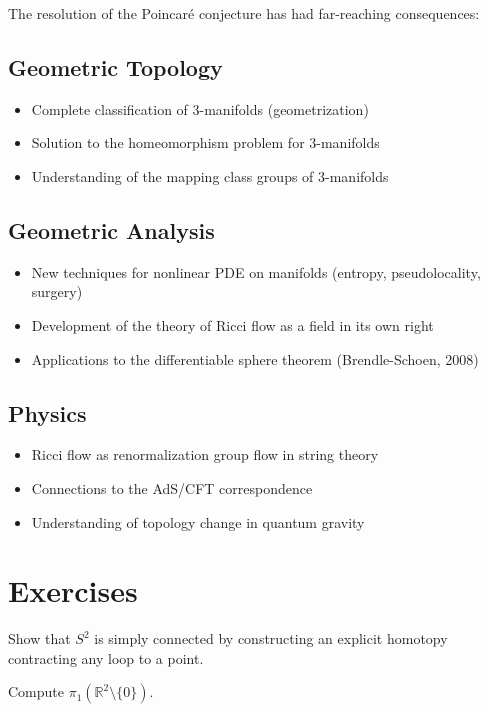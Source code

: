 The resolution of the Poincar\'{e} conjecture has had far-reaching consequences:

\subsection{Geometric Topology}
\begin{itemize}
  \item Complete classification of 3-manifolds (geometrization)
  \item Solution to the homeomorphism problem for 3-manifolds
  \item Understanding of the mapping class groups of 3-manifolds
\end{itemize}

\subsection{Geometric Analysis}
\begin{itemize}
  \item New techniques for nonlinear PDE on manifolds (entropy, pseudolocality, surgery)
  \item Development of the theory of Ricci flow as a field in its own right
  \item Applications to the differentiable sphere theorem (Brendle-Schoen, 2008)
\end{itemize}

\subsection{Physics}
\begin{itemize}
  \item Ricci flow as renormalization group flow in string theory
  \item Connections to the AdS/CFT correspondence
  \item Understanding of topology change in quantum gravity
\end{itemize}

\section{Exercises}

\begin{exercise}
Show that $S^2$ is simply connected by constructing an explicit homotopy contracting any loop to a point.
\end{exercise}

\begin{exercise}
Compute $\pi_1(\mathbb{R}^2 \setminus \{0\})$.
\end{exercise}

